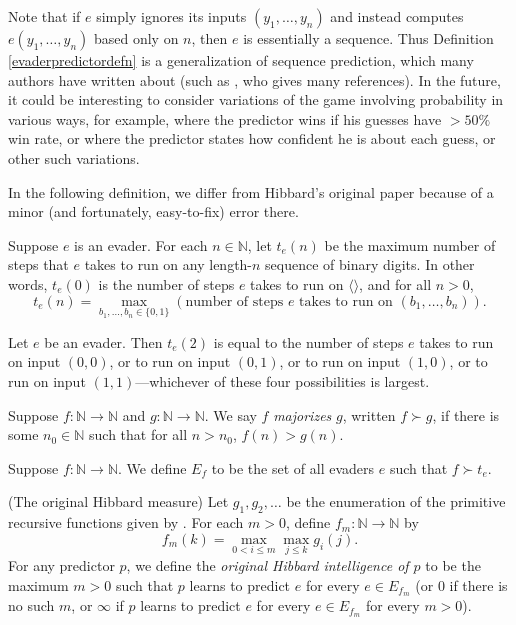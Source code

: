 \documentclass[twoside,11pt]{article}
\begin{document}
Note that if $e$ simply ignores its inputs $(y_1,\ldots,y_n)$ and instead
computes $e(y_1,\ldots,y_n)$ based only on $n$, then $e$ is essentially a sequence.
Thus Definition \ref{evaderpredictordefn} is a generalization of sequence prediction,
which many authors have written about (such as \citet{legg2006there}, who gives many
references). In the future, it could be interesting to consider variations of
the game involving probability in various ways, for example, where the predictor wins
if his guesses have $>50\%$ win rate, or where the predictor states how confident he is
about each guess, or other such variations.

In the following definition, we differ from Hibbard's original paper
because of a minor (and fortunately, easy-to-fix) error there.

\begin{definition}
\label{tsubedefinition}
    Suppose $e$ is an evader.
    For each $n\in\mathbb N$, let $t_e(n)$ be the maximum number of steps that $e$ takes
    to run on any length-$n$ sequence of binary digits.
    In other words, $t_e(0)$ is the number of steps $e$ takes to run on $\langle\rangle$,
    and for all $n>0$,
    \[
        t_e(n) = \max_{b_1,\ldots,b_n\in \{0,1\}}
        (\text{number of steps $e$ takes to run on $(b_1,\ldots,b_n)$}).
    \]
\end{definition}

\begin{example}
    Let $e$ be an evader. Then
    $t_e(2)$ is equal to the number of steps $e$ takes to run on input
    $(0,0)$, or to run on input $(0,1)$, or to run on input $(1,0)$, or to run on input
    $(1,1)$---whichever of these four possibilities is largest.
\end{example}

\begin{definition}
\label{functionsuccdefn}
    Suppose $f:\mathbb N\to\mathbb N$ and $g:\mathbb N\to\mathbb N$.
    We say $f$ \emph{majorizes} $g$, written
    $f\succ g$, if there is some $n_0\in \mathbb N$ such that for all
    $n>n_0$, $f(n)>g(n)$.
\end{definition}

\begin{definition}
\label{evadersetdefinition}
    Suppose $f:\mathbb N\to\mathbb N$. We define
    $E_f$ to be the set of all evaders $e$ such that
    $f\succ t_e$.
\end{definition}

\begin{definition}
\label{classichibbardmeasuredefn}
    (The original Hibbard measure)
    Let $g_1,g_2,\ldots$ be the enumeration of the primitive recursive
    functions given by \citet{liu1960enumeration}.
    For each $m>0$, define $f_m:\mathbb N\to\mathbb N$ by
    \[f_m(k)=\max_{0<i\leq m}\max_{j\leq k}g_i(j).\]
    For any predictor $p$, we define the \emph{original Hibbard intelligence of $p$}
    to be the maximum $m>0$
    such that $p$ learns to predict $e$ for every $e\in E_{f_m}$
    (or $0$ if there is no such $m$, or $\infty$ if $p$ learns to predict $e$
    for every $e\in E_{f_m}$ for every $m>0$).
\end{definition}
\end{document}
